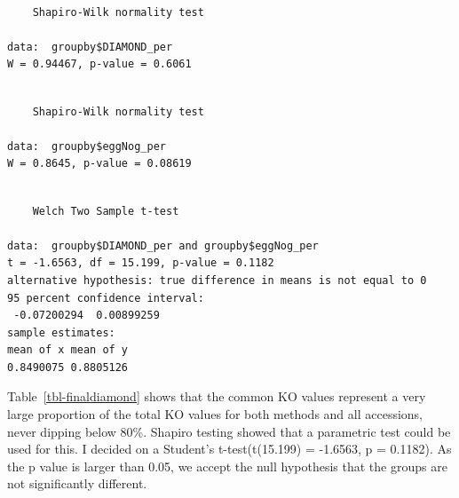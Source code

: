 \documentclass[
  letterpaper,
  DIV=11,
  numbers=noendperiod]{scrreprt}
\newenvironment{Shaded}{\begin{snugshade}}{\end{snugshade}}
\newcommand{\FunctionTok}[1]{\textcolor[rgb]{0.28,0.35,0.67}{#1}}
\newcommand{\NormalTok}[1]{\textcolor[rgb]{0.00,0.23,0.31}{#1}}
\newcommand{\OtherTok}[1]{\textcolor[rgb]{0.00,0.23,0.31}{#1}}
\newcommand{\SpecialCharTok}[1]{\textcolor[rgb]{0.37,0.37,0.37}{#1}}
\begin{document}
\begin{Shaded}
\end{Shaded}

\begin{verbatim}

    Shapiro-Wilk normality test

data:  groupby$DIAMOND_per
W = 0.94467, p-value = 0.6061
\end{verbatim}

\begin{Shaded}
\end{Shaded}

\begin{verbatim}

    Shapiro-Wilk normality test

data:  groupby$eggNog_per
W = 0.8645, p-value = 0.08619
\end{verbatim}

\begin{Shaded}
\end{Shaded}

\begin{verbatim}

    Welch Two Sample t-test

data:  groupby$DIAMOND_per and groupby$eggNog_per
t = -1.6563, df = 15.199, p-value = 0.1182
alternative hypothesis: true difference in means is not equal to 0
95 percent confidence interval:
 -0.07200294  0.00899259
sample estimates:
mean of x mean of y 
0.8490075 0.8805126 
\end{verbatim}

Table~\ref{tbl-finaldiamond} shows that the common KO values represent a
very large proportion of the total KO values for both methods and all
accessions, never dipping below 80\%. Shapiro testing showed that a
parametric test could be used for this. I decided on a Student's
t-test(t(15.199) = -1.6563, p = 0.1182). As the p value is larger than
0.05, we accept the null hypothesis that the groups are not
significantly different.
\end{document}
